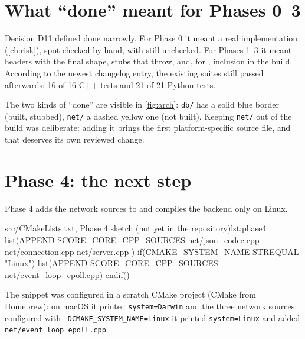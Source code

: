 
\section{What ``done'' meant for Phases 0--3}
Decision D11 defined done narrowly. For Phase 0 it meant a real implementation (\cref{ch:risk}), spot-checked by hand,
with  still unchecked. For Phases 1--3 it meant headers with the final shape, 
stubs that throw, and, for , inclusion in the build. According to the newest changelog entry, the existing suites
still passed afterwards: 16 of 16 C++ tests and 21 of 21 Python tests.

\begin{remarkbox}
The two kinds of ``done'' are visible in \cref{fig:arch}: \texttt{db/} has a solid blue border (built, stubbed),
\texttt{net/} a dashed yellow one (not built). Keeping \texttt{net/} out of the build was deliberate: adding it brings the
first platform-specific source file, and that deserves its own reviewed change.
\end{remarkbox}

\section{Phase 4: the next step}
Phase 4 adds the network sources to  and compiles the  backend only on Linux.

\begin{code}[listing options={style=plaindark}]{src/CMakeLists.txt, Phase 4 sketch (not yet in the repository)}{lst:phase4}
list(APPEND SCORE_CORE_CPP_SOURCES
    net/json_codec.cpp
    net/connection.cpp
    net/server.cpp
)
if(CMAKE_SYSTEM_NAME STREQUAL "Linux")
    list(APPEND SCORE_CORE_CPP_SOURCES net/event_loop_epoll.cpp)
endif()
\end{code}

\begin{verified}
The snippet was configured in a scratch CMake project (CMake from Homebrew): on macOS it printed
\texttt{system=Darwin} and the three network sources; configured with \texttt{-DCMAKE\_SYSTEM\_NAME=Linux} it printed
\texttt{system=Linux} and added \texttt{net/event\_loop\_epoll.cpp}.
\end{verified}

